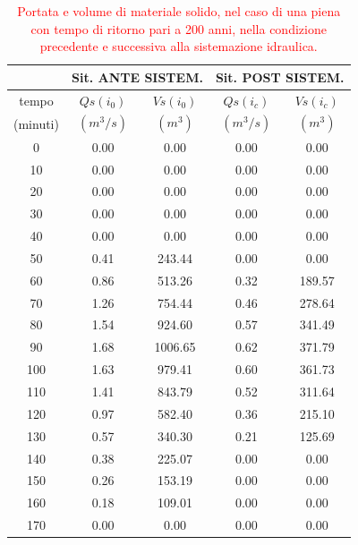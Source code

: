 \begin{table}[H] \centering
    \caption{\textcolor{red}{Portata e volume di materiale solido, nel caso di una piena con tempo di ritorno pari a 200 anni, nella condizione precedente e successiva alla sistemazione idraulica.}}
    \begin{tabular}{ccccc}
        \toprule
& \multicolumn{2}{c}{Sit. ANTE SISTEM.} & \multicolumn{2}{c}{Sit. POST SISTEM.} \\
\midrule
tempo  & $Qs(i_0)$ & $Vs(i_0)$ & $Qs(i_c)$  & $Vs(i_c)$  \\
(minuti) & $(m^3/s)$ & $(m^3)$ & $(m^3/s)$ & $(m^3)$  \\
\midrule
    0     & 0.00 & 0.00 & 0.00 & 0.00   \\
    10    & 0.00 & 0.00  & 0.00  & 0.00                   \\
    20    & 0.00 & 0.00  & 0.00  & 0.00                   \\
    30    & 0.00 & 0.00 & 0.00  & 0.00                   \\
    40    & 0.00 & 0.00& 0.00   & 0.00                   \\
    50    & 0.41 & 243.44  & 0.00       & 0.00                   \\
    60    & 0.86 & 513.26 & 0.32     & 189.57                 \\
    70    & 1.26                   & 754.44                  & 0.46                    & 278.64                 \\
    80    & 1.54                   & 924.60                  & 0.57                    & 341.49                 \\
    90    & 1.68                   & 1006.65                 & 0.62                    & 371.79                 \\
    100   & 1.63                   & 979.41                  & 0.60                    & 361.73                 \\
    110   & 1.41                   & 843.79                  & 0.52                    & 311.64                 \\
    120   & 0.97                   & 582.40                  & 0.36                    & 215.10                 \\
    130   & 0.57                   & 340.30                  & 0.21                    & 125.69                 \\
    140   & 0.38                   & 225.07                  & 0.00                    & 0.00                   \\
    150   & 0.26                   & 153.19                  & 0.00                    & 0.00                   \\
    160   & 0.18                   & 109.01                  & 0.00                    & 0.00                   \\
    170   & 0.00                   & 0.00                    & 0.00                    & 0.00     \\
    \bottomrule             
    \end{tabular}
    \end{table}

